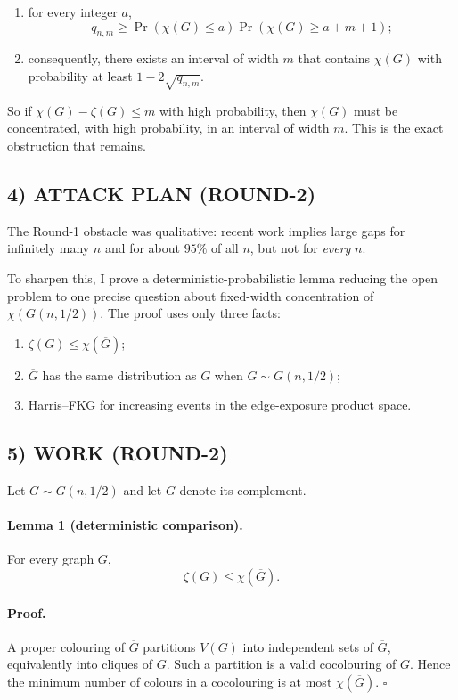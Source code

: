 \begin{enumerate}
\item for every integer $a$,
\[
q_{n,m}\ge \Pr(\chi(G)\le a)\Pr(\chi(G)\ge a+m+1);
\]
\item consequently, there exists an interval of width $m$ that contains
$\chi(G)$ with probability at least $1-2\sqrt{q_{n,m}}$.
\end{enumerate}

So if $\chi(G)-\zeta(G)\le m$ with high probability, then $\chi(G)$ must be concentrated,
with high probability, in an interval of width $m$.
This is the exact obstruction that remains.

\subsection*{4) ATTACK PLAN (ROUND-2)}

The Round-1 obstacle was qualitative:
recent work implies large gaps for infinitely many $n$ and for about $95\%$ of all $n$,
but not for \emph{every} $n$.

To sharpen this, I prove a deterministic-probabilistic lemma reducing the open problem to one precise
question about fixed-width concentration of $\chi(G(n,1/2))$.
The proof uses only three facts:

\begin{enumerate}
\item $\zeta(G)\le \chi(\overline G)$;
\item $\overline G$ has the same distribution as $G$ when $G\sim G(n,1/2)$;
\item Harris--FKG for increasing events in the edge-exposure product space.
\end{enumerate}

\subsection*{5) WORK (ROUND-2)}

Let $G\sim G(n,1/2)$ and let $\overline G$ denote its complement.

\paragraph{Lemma 1 (deterministic comparison).}
For every graph $G$,
\[
\zeta(G)\le \chi(\overline G).
\]

\paragraph{Proof.}
A proper colouring of $\overline G$ partitions $V(G)$ into independent sets of $\overline G$,
equivalently into cliques of $G$.
Such a partition is a valid cocolouring of $G$.
Hence the minimum number of colours in a cocolouring is at most $\chi(\overline G)$. \hfill $\square$

